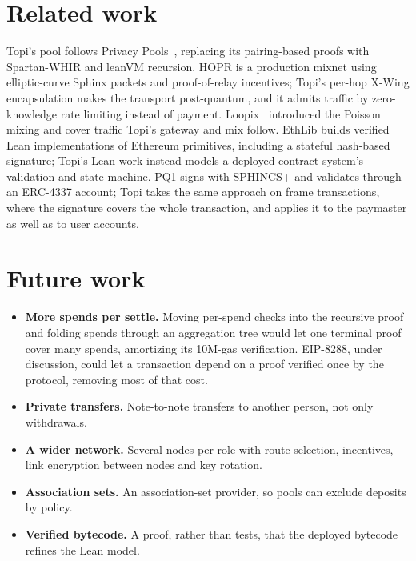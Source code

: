 \documentclass[11pt,a4paper]{article}
\begin{document}
\section{Related work}

Topi's pool follows Privacy Pools~\cite{privacypools}, replacing its pairing-based proofs with Spartan-WHIR
and leanVM recursion. HOPR is a production mixnet using elliptic-curve Sphinx packets and proof-of-relay
incentives; Topi's per-hop X-Wing encapsulation makes the transport post-quantum, and it admits traffic by
zero-knowledge rate limiting instead of payment. Loopix~\cite{loopix} introduced the Poisson mixing and
cover traffic Topi's gateway and mix follow. EthLib builds verified Lean implementations of Ethereum
primitives, including a stateful hash-based signature; Topi's Lean work instead models a deployed
contract system's validation and state machine. PQ1 signs with SPHINCS+ and validates through an ERC-4337
account; Topi takes the same approach on frame transactions, where the signature covers the whole
transaction, and applies it to the paymaster as well as to user accounts.

\section{Future work}

\begin{itemize}
  \item \textbf{More spends per settle.} Moving per-spend checks into the recursive proof and folding
    spends through an aggregation tree would let one terminal proof cover many spends, amortizing its
    10M-gas verification. EIP-8288, under discussion, could let a transaction depend on a proof verified
    once by the protocol, removing most of that cost.
  \item \textbf{Private transfers.} Note-to-note transfers to another person, not only withdrawals.
  \item \textbf{A wider network.} Several nodes per role with route selection, incentives, link
    encryption between nodes and key rotation.
  \item \textbf{Association sets.} An association-set provider, so pools can exclude deposits by policy.
  \item \textbf{Verified bytecode.} A proof, rather than tests, that the deployed bytecode refines the
    Lean model.
\end{itemize}
\end{document}

